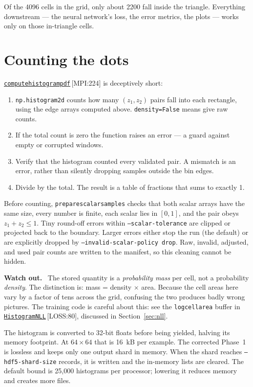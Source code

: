 \documentclass[11pt,a4paper]{report}
\newcommand{\srcbase}{vscode://file/Users/syellapa/Documents/Research/2026/ANSYS/Multi-ScalarPDF}
\newcommand{\dmdn}{dirichlet\string_mdn}
\newcommand{\srctag}[1]{{\footnotesize\textcolor{TagGray}{[#1]}}}
\newcommand{\Mpi}[2]{\href{\srcbase/EnsightPDFHybridDatasetMPI.py:#1}{\texttt{#2}}\,\srctag{MPI:#1}}
\newcommand{\Loss}[2]{\href{\srcbase/\dmdn/losses.py:#1}{\texttt{#2}}\,\srctag{LOSS:#1}}
\newcommand{\code}[1]{\texttt{#1}}
\renewcommand{\_}{\origtextunderscore\allowbreak}
\newlength{\calloutwidth}
\newcommand{\calloutOpen}{%
  \par\medskip\noindent
  \setlength{\calloutwidth}{\dimexpr\linewidth-2\fboxsep\relax}%
  \begin{lrbox}{\calloutbox}\begin{minipage}{\calloutwidth}}
\newcommand{\calloutClose}[1]{%
  \end{minipage}\end{lrbox}\colorbox{#1}{\usebox{\calloutbox}}\par\medskip}
\newenvironment{caution}
  {\calloutOpen\textbf{Watch out.}\ }
  {\calloutClose{WarnBG}}
\begin{document}
Of the 4096 cells in the grid, only about 2200 fall inside the triangle. Everything
downstream --- the neural network's loss, the error metrics, the plots --- works only on those
in-triangle cells.

\section{Counting the dots}

\Mpi{224}{compute\_histogram\_pdf} is deceptively short:

\begin{enumerate}
  \item \code{np.histogram2d} counts how many $(z_1, z_2)$ pairs fall into each rectangle,
        using the edge arrays computed above. \code{density=False} means give raw counts.
  \item If the total count is zero the function raises an error --- a guard against
        empty or corrupted windows.
  \item Verify that the histogram counted every validated pair.  A mismatch is an error,
        rather than silently dropping samples outside the bin edges.
  \item Divide by the total. The result is a table of fractions that sums to
        exactly 1.
\end{enumerate}

Before counting, \code{prepare\_scalar\_samples} checks that both scalar arrays have the
same size, every number is finite, each scalar lies in $[0,1]$, and the pair obeys
$z_1+z_2\leq1$. Tiny round-off errors within \code{--scalar-tolerance} are clipped or
projected back to the boundary. Larger errors either stop the run (the default) or are
explicitly dropped by \code{--invalid-scalar-policy drop}. Raw, invalid, adjusted, and
used pair counts are written to the manifest, so this cleaning cannot be hidden.

\begin{caution}
The stored quantity is a \emph{probability mass} per cell, not a probability \emph{density}.
The distinction is: mass = density $\times$ area. Because the cell areas here vary by a
factor of tens across the grid, confusing the two produces badly wrong pictures. The
training code is careful about this: see the \code{log\_cell\_area} buffer in
\Loss{80}{HistogramNLL}, discussed in Section~\ref{sec:nll}.
\end{caution}

The histogram is converted to 32-bit floats before being yielded, halving its memory
footprint. At $64\times64$ that is 16~kB per example. The corrected Phase~1 is lossless
and keeps only one output shard in memory. When the shard reaches
\code{--hdf5-shard-size} records, it is written and the in-memory lists are cleared.
The default bound is 25{,}000 histograms per processor; lowering it reduces memory and
creates more files.
\end{document}
